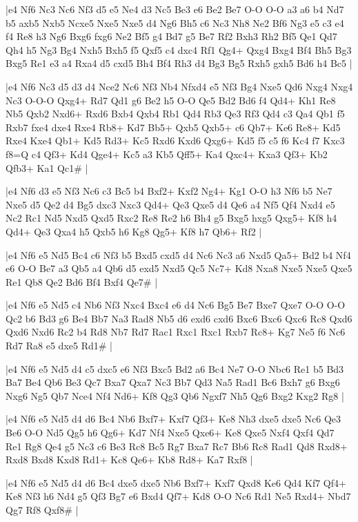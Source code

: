 \whitename{}
\blackname{}
\makegametitle
|e4 Nf6 Nc3 Nc6 Nf3 d5 e5 Ne4 d3 Nc5 Be3 e6 Be2 Be7 O-O O-O a3 a6 b4 Nd7 b5 axb5 Nxb5 Ncxe5 Nxe5 Nxe5 d4 Ng6 Bh5 c6 Nc3 Nh8 Ne2 Bf6 Ng3 e5 c3 e4 f4 Re8 h3 Ng6 Bxg6 fxg6 Ne2 Bf5 g4 Bd7 g5 Be7 Rf2 Bxh3 Rh2 Bf5 Qe1 Qd7 Qh4 h5 Ng3 Bg4 Nxh5 Bxh5 f5 Qxf5 c4 dxc4 Rf1 Qg4+ Qxg4 Bxg4 Bf4 Bh5 Bg3 Bxg5 Re1 e3 a4 Rxa4 d5 cxd5 Bh4 Bf4 Rh3 d4 Bg3 Bg5 Rxh5 gxh5 Bd6 h4 Bc5  |

\whitename{}
\blackname{}
\makegametitle
|e4 Nf6 Nc3 d5 d3 d4 Nce2 Nc6 Nf3 Nb4 Nfxd4 e5 Nf3 Bg4 Nxe5 Qd6 Nxg4 Nxg4 Nc3 O-O-O Qxg4+ Rd7 Qd1 g6 Be2 h5 O-O Qe5 Bd2 Bd6 f4 Qd4+ Kh1 Re8 Nb5 Qxb2 Nxd6+ Rxd6 Bxb4 Qxb4 Rb1 Qd4 Rb3 Qe3 Rf3 Qd4 c3 Qa4 Qb1 f5 Rxb7 fxe4 dxe4 Rxe4 Rb8+ Kd7 Bb5+ Qxb5 Qxb5+ c6 Qb7+ Ke6 Re8+ Kd5 Rxe4 Kxe4 Qb1+ Kd5 Rd3+ Kc5 Rxd6 Kxd6 Qxg6+ Kd5 f5 c5 f6 Kc4 f7 Kxc3 f8=Q c4 Qf3+ Kd4 Qge4+ Kc5 a3 Kb5 Qff5+ Ka4 Qxc4+ Kxa3 Qf3+ Kb2 Qfb3+ Ka1 Qc1\#  |

\whitename{}
\blackname{}
\makegametitle
|e4 Nf6 d3 e5 Nf3 Nc6 c3 Bc5 b4 Bxf2+ Kxf2 Ng4+ Kg1 O-O h3 Nf6 b5 Ne7 Nxe5 d5 Qe2 d4 Bg5 dxc3 Nxc3 Qd4+ Qe3 Qxe5 d4 Qe6 a4 Nf5 Qf4 Nxd4 e5 Nc2 Rc1 Nd5 Nxd5 Qxd5 Rxc2 Re8 Re2 h6 Bh4 g5 Bxg5 hxg5 Qxg5+ Kf8 h4 Qd4+ Qe3 Qxa4 h5 Qxb5 h6 Kg8 Qg5+ Kf8 h7 Qb6+ Rf2  |

\whitename{}
\blackname{}
\makegametitle
|e4 Nf6 e5 Nd5 Bc4 c6 Nf3 b5 Bxd5 cxd5 d4 Nc6 Nc3 a6 Nxd5 Qa5+ Bd2 b4 Nf4 e6 O-O Be7 a3 Qb5 a4 Qb6 d5 exd5 Nxd5 Qc5 Nc7+ Kd8 Nxa8 Nxe5 Nxe5 Qxe5 Re1 Qb8 Qe2 Bd6 Bf4 Bxf4 Qe7\#  |

\whitename{}
\blackname{}
\makegametitle
|e4 Nf6 e5 Nd5 c4 Nb6 Nf3 Nxc4 Bxc4 e6 d4 Nc6 Bg5 Be7 Bxe7 Qxe7 O-O O-O Qc2 b6 Bd3 g6 Be4 Bb7 Na3 Rad8 Nb5 d6 exd6 cxd6 Bxc6 Bxc6 Qxc6 Rc8 Qxd6 Qxd6 Nxd6 Rc2 b4 Rd8 Nb7 Rd7 Rac1 Rxc1 Rxc1 Rxb7 Rc8+ Kg7 Ne5 f6 Nc6 Rd7 Ra8 e5 dxe5 Rd1\#  |

\whitename{}
\blackname{}
\makegametitle
|e4 Nf6 e5 Nd5 d4 c5 dxc5 e6 Nf3 Bxc5 Bd2 a6 Bc4 Ne7 O-O Nbc6 Re1 b5 Bd3 Ba7 Be4 Qb6 Be3 Qc7 Bxa7 Qxa7 Nc3 Bb7 Qd3 Na5 Rad1 Bc6 Bxh7 g6 Bxg6 Nxg6 Ng5 Qb7 Nce4 Nf4 Nd6+ Kf8 Qg3 Qb6 Ngxf7 Nh5 Qg6 Bxg2 Kxg2 Rg8  |

\whitename{}
\blackname{}
\makegametitle
|e4 Nf6 e5 Nd5 d4 d6 Bc4 Nb6 Bxf7+ Kxf7 Qf3+ Ke8 Nh3 dxe5 dxe5 Nc6 Qe3 Be6 O-O Nd5 Qg5 h6 Qg6+ Kd7 Nf4 Nxe5 Qxe6+ Ke8 Qxe5 Nxf4 Qxf4 Qd7 Re1 Rg8 Qe4 g5 Nc3 c6 Be3 Rc8 Bc5 Rg7 Bxa7 Rc7 Bb6 Rc8 Rad1 Qd8 Rxd8+ Rxd8 Bxd8 Kxd8 Rd1+ Kc8 Qe6+ Kb8 Rd8+ Ka7 Rxf8  |

\whitename{}
\blackname{}
\makegametitle
|e4 Nf6 e5 Nd5 d4 d6 Bc4 dxe5 dxe5 Nb6 Bxf7+ Kxf7 Qxd8 Ke6 Qd4 Kf7 Qf4+ Ke8 Nf3 h6 Nd4 g5 Qf3 Bg7 e6 Bxd4 Qf7+ Kd8 O-O Nc6 Rd1 Ne5 Rxd4+ Nbd7 Qg7 Rf8 Qxf8\#  |

